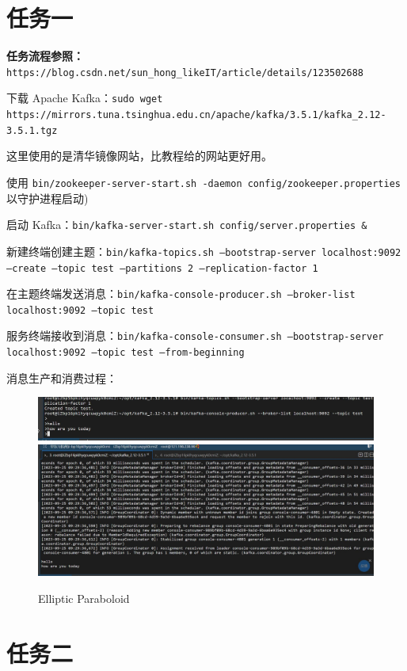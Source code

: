 \documentclass{article}
\begin{document}
\section*{任务一}

\textbf{任务流程参照：}\verb|https://blog.csdn.net/sun_hong_likeIT/article/details/123502688|

下载 Apache Kafka：\texttt{sudo wget https://mirrors.tuna.tsinghua.edu.cn/apache/kafka/3.5.1/kafka\_2.12-3.5.1.tgz}

这里使用的是清华镜像网站，比教程给的网站更好用。

使用 \texttt{bin/zookeeper-server-start.sh -daemon config/zookeeper.properties} 以守护进程启动)

启动 Kafka：\texttt{bin/kafka-server-start.sh config/server.properties \&}

新建终端创建主题：\texttt{bin/kafka-topics.sh --bootstrap-server localhost:9092 --create --topic test --partitions 2 --replication-factor 1}

在主题终端发送消息：\texttt{bin/kafka-console-producer.sh --broker-list localhost:9092 --topic test}

服务终端接收到消息：\texttt{bin/kafka-console-consumer.sh --bootstrap-server localhost:9092 --topic test --from-beginning}

消息生产和消费过程：
\begin{figure}[htbp]
    \centering
    \includegraphics{mission1.1.jpg}
    \includegraphics*{mission1.2.jpg}
    \caption{Elliptic Paraboloid}
\end{figure}

\section*{任务二}
\end{document}
